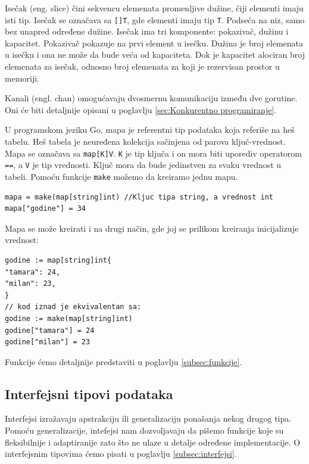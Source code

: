 \documentclass[a4paper]{article}
\begin{document}
Isečak (eng. slice) čini sekvencu elemenata promenljive dužine, čiji elementi imaju isti tip. Isečak se označava sa \texttt{[]T}, gde elementi imaju tip \texttt{T}. Podseća na niz, samo bez unapred određene dužine. Isečak ima tri komponente: pokazivač, dužinu i kapacitet. Pokazivač pokazuje na prvi element u isečku. Dužina je broj elemenata u isečku i ona ne može da bude veća od kapaciteta. Dok je kapacitet alociran broj elemenata za isečak, odnosno broj elemenata za koji je rezervisan prostor u memoriji.

Kanali (engl. chan) omogućavaju dvosmernu komunikaciju između dve gorutine. Oni će biti detaljnije opisani u poglavlju \ref{sec:Konkurentno programiranje}.

U programskom jeziku Go, mapa je referentni tip podataka koja referiše na heš tabelu. Heš tabela je neuređena kolekcija sačinjena od parova ključ-vrednost. Mapa se označava sa \texttt{map[K]V}. \texttt{K} je tip ključa i on mora biti uporediv operatorom \texttt{==}, a \texttt{V} je tip vrednosti. Ključ mora da bude jedinstven za svaku vrednost u tabeli.
Pomoću funkcije \texttt{make} možemo da kreiramo jednu mapu.

\begin{lstlisting}[caption={Kreiranje mape},frame=single, label=Kreiranje_mape]
mapa = make(map[string]int) //Kljuc tipa string, a vrednost int
mapa["godine"] = 34
\end{lstlisting}

Mapa se može kreirati i na drugi način, gde joj se prilikom kreiranja inicijalizuje vrednost:

\begin{lstlisting}[caption={Inicijalizacija mape prilikom deklaracije},frame=single, label=Inicijalizacija_mape_prilikom_deklaracije]
godine := map[string]int{
"tamara": 24,
"milan": 23,
}
// kod iznad je ekvivalentan sa:
godine := make(map[string]int)
godine["tamara"] = 24
godine["milan"] = 23
\end{lstlisting}

Funkcije ćemo detaljnije predstaviti u poglavlju \ref{subsec:funkcije}.

\subsection{Interfejsni tipovi podataka}
\label{subsec:Inter_tipovi}

Interfejsi izražavaju apstrakciju ili generalizaciju ponašanja nekog drugog tipa. Pomoću generalizacije, intefejsi nam dozvoljavaju  da pišemo funkcije koje su fleksibilnije i adaptiranije zato što ne ulaze u detalje određene implementacije. O interfejsnim tipovima ćemo pisati u poglavlju \ref{subsec:interfejsi}.
\end{document}
